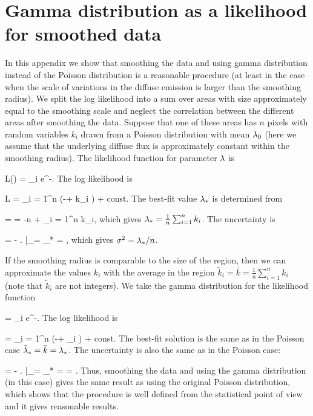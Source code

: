 \newpage
\section{Gamma distribution as a likelihood for smoothed data}

In this appendix we show that smoothing the data and using gamma distribution instead of the Poisson distribution
is a reasonable procedure (at least in the case when the scale of variations in the diffuse emission is larger than the smoothing radius).
We split the log likelihood into a sum over areas with size approximately equal to the smoothing scale
and neglect the correlation between the different areas after smoothing the data.
Suppose that one of these areas has $n$ pixels with random variables $k_i$ drawn from a Poisson distribution with mean $\lambda_0$
(here we assume that the underlying diffuse flux is approximately constant within the smoothing radius).
The likelihood function for parameter $\lambda$ is

\be
L(\ld) = \prod_i  e^{-\ld}.
\ee
The log likelihood is

\be
\log L = \sum_{i = 1}^n (-\ld + k_i \log \ld) + const.
\ee
The best-fit value $\lambda_*$ is determined from

 =  = -n +  \sum_{i = 1}^n k_i,
\ee
which gives $\lambda_* = \frac{1}{n} \sum_{i = 1}^n k_i$.
The uncertainty is

\be
{} = - \left.  \right|_{\ld = \ld_*} = ,
\ee
which gives $\sigma^2 = \lambda_* / n$.

If the smoothing radius is comparable to the size of the region,
then we can approximate the values $k_i$ with the average in the region $\tilde{k}_i = \bar{k} = \frac{1}{n} \sum_{i = 1}^n k_i$
(note that $\tilde{k}_i$ are not integers).
We take the gamma distribution for the likelihood function 

\be
{} = \prod_i  e^{-\ld}.
\ee
The log likelihood is

\be
\log {} = \sum_{i = 1}^n (-\ld + _i \log \ld) + const.
\ee
The best-fit solution is the same as in the Poisson case $\tilde{\lambda}_* = \bar{k} = {\lambda}_*$.
The uncertainty is also the same as in the Poisson case:

\be
{} = - \left.  \right|_{\ld = \td{\ld}_*} =  = .
\ee
Thus, smoothing the data and using the gamma distribution (in this case) gives the same result as using the original Poisson distribution,
which shows that the procedure is well defined from the statistical point of view and it gives reasonable results.